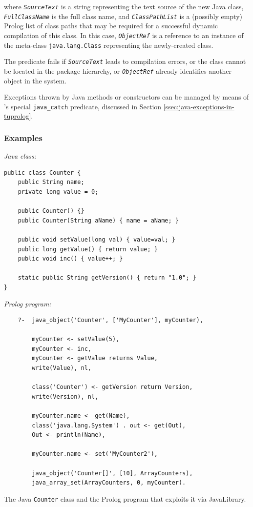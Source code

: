 \begin{description}
        where \texttt{\textit{SourceText}} is a string representing the text source of the new Java class, \texttt{\textit{FullClassName}} is the full class name, and \texttt{\textit{ClassPathList}} is a (possibly empty) Prolog list of class paths that may be required for a successful dynamic compilation of this class.
        In this case, \texttt{\textit{ObjectRef}} is a reference to an instance of the meta-class \texttt{java.lang.Class} representing the newly-created class.

        The predicate fails if \texttt{\textit{SourceText}} leads to compilation errors, or the class cannot be located in the package hierarchy, or \texttt{\textit{ObjectRef}} already identifies another object in the system.
\end{description}

\noindent Exceptions thrown by Java methods or constructors can be managed by means of \tuprolog{}'s special \texttt{java\_catch} %
predicate, discussed in Section \ref{ssec:java-exceptions-in-tuprolog}.

\subsubsection{Examples}

\begin{table}
\textit{Java class:}
\begin{verbatim}
public class Counter {
    public String name;
    private long value = 0;

    public Counter() {}
    public Counter(String aName) { name = aName; }

    public void setValue(long val) { value=val; }
    public long getValue() { return value; }
    public void inc() { value++; }

    static public String getVersion() { return "1.0"; }
}
\end{verbatim}

\textit{Prolog program:}
\begin{verbatim}
    ?-  java_object('Counter', ['MyCounter'], myCounter),

        myCounter <- setValue(5),
        myCounter <- inc,
        myCounter <- getValue returns Value,
        write(Value), nl,

        class('Counter') <- getVersion return Version,
        write(Version), nl,

        myCounter.name <- get(Name),
        class('java.lang.System') . out <- get(Out),
        Out <- println(Name),

        myCounter.name <- set('MyCounter2'),

        java_object('Counter[]', [10], ArrayCounters),
        java_array_set(ArrayCounters, 0, myCounter).
\end{verbatim}
\caption{The Java \texttt{Counter} class and the Prolog program that exploits it via JavaLibrary.}
\label{tab:javalibrary-counter-example}
\end{table}

